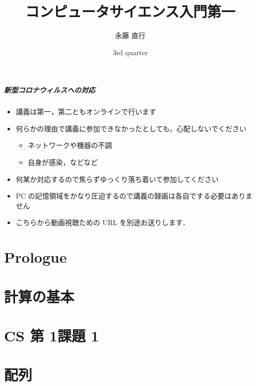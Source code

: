 \documentclass[final,c]{beamer}
\title[elementaryCS-1st]{コンピュータサイエンス入門第一}
\date[3rd quarter]{3rd quarter}
\author[Naoyuki Nagatou]{永藤 直行}
\institute[TITECH]{東京工業大学}
\begin{document}
\begin{frame}
\frametitle{新型コロナウィルスへの対応}
  \begin{itemize}
\item 講義は第一，第二ともオンラインで行います
\item 何らかの理由で講義に参加できなかったとしても，心配しないでください
    \begin{itemize}
\item ネットワークや機器の不調
\item 自身が感染，などなど
    \end{itemize}
\item 何某か対応するので焦らずゆっくり落ち着いて参加してください
\item PC の記憶領域をかなり圧迫するので講義の録画は各自でする必要はありません
\item こちらから動画視聴ための URL を別途お送りします．
  \end{itemize}
\end{frame}
\frame{\titlepage}
%
%
\part{Prologue}


%
%

%
%
\part{計算の基本}

%

\part{CS 第 1\textemdash 課題 1}

%
%
\part{配列}

%
%
\end{document}
